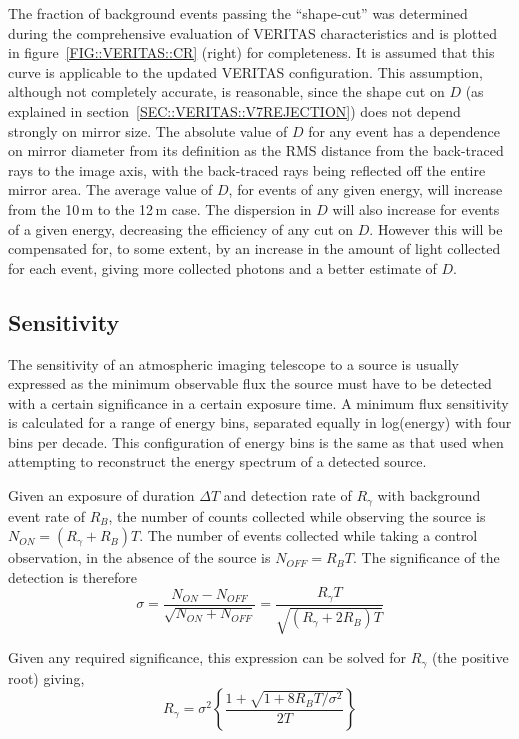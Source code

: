 The fraction of background events passing the ``shape-cut'' was
determined during the comprehensive evaluation of VERITAS
characteristics and is plotted in figure~\ref{FIG::VERITAS::CR}
(right) for completeness. It is assumed that this curve is applicable
to the updated VERITAS configuration.  This assumption, although not
completely accurate, is reasonable, since the shape cut on $D$ (as
explained in section~\ref{SEC::VERITAS::V7REJECTION}) does not depend
strongly on mirror size. The absolute value of $D$ for any event has a
dependence on mirror diameter from its definition as the RMS distance
from the back-traced rays to the image axis, with the back-traced rays
being reflected off the entire mirror area. The average value of $D$,
for events of any given energy, will increase from the 10\,m to the
12\,m case. The dispersion in $D$ will also increase for events of a
given \Gray energy, decreasing the efficiency of any cut on
$D$. However this will be compensated for, to some extent, by an
increase in the amount of light collected for each event, giving more
collected photons and a better estimate of $D$.

\subsection{Sensitivity}
\label{SEC::VERITAS::V4SENSITIVITY}

The sensitivity of an atmospheric \Cerenkov imaging telescope to a
\Gray source is usually expressed as the minimum observable flux the
source must have to be detected with a certain significance in a
certain exposure time. A minimum flux sensitivity is calculated for a
range of energy bins, separated equally in log(energy) with four bins
per decade. This configuration of energy bins is the same as that used
when attempting to reconstruct the energy spectrum of a detected
source.

Given an exposure of duration $\Delta T$ and \Gray detection rate of
$R_\gamma$ with background event rate of $R_B$, the number of counts
collected while observing the source is $N_{ON}=(R_\gamma+R_B) T$. The
number of events collected while taking a control observation, in the
absence of the source is $N_{OFF}=R_B T$. The significance of the
detection is therefore
\[ \sigma=\frac{N_{ON}-N_{OFF}}{\sqrt{N_{ON}+N_{OFF}}}=
\frac{R_\gamma T}{\sqrt{(R_\gamma+2R_B) T}} \]

Given any required significance, this expression can be solved for
$R_\gamma$ (the positive root) giving,
\[ R_\gamma = 
\sigma^2\left\{\frac{1+\sqrt{1+8R_B T/\sigma^2}}{2 T}\right\} \]

